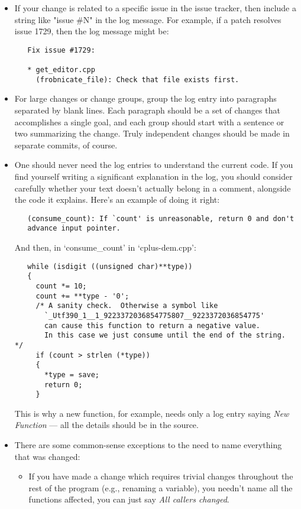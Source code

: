 \begin{itemize}
    \item If your change is related to a specific issue in the issue tracker,
        then include a string like "issue \#N" in the log message.  For
        example, if a patch resolves issue 1729, then the log message might
        be:
\begin{Verbatim}
   Fix issue #1729:

   * get_editor.cpp
     (frobnicate_file): Check that file exists first.
\end{Verbatim}

    \item For large changes or change groups, group the log entry into
        paragraphs separated by blank lines.  Each paragraph should be a set
        of changes that accomplishes a single goal, and each group should
        start with a sentence or two summarizing the change.  Truly
        independent changes should be made in separate commits, of course.

    \item One should never need the log entries to understand the current code.
        If you find yourself writing a significant explanation in the log, you
        should consider carefully whether your text doesn't actually belong in
        a comment, alongside the code it explains.  Here's an example of doing
        it right:
\begin{Verbatim}
   (consume_count): If `count' is unreasonable, return 0 and don't
   advance input pointer.
\end{Verbatim}
        And then, in `consume\_count' in `cplus-dem.cpp':
\begin{Verbatim}
   while (isdigit ((unsigned char)**type))
   {
     count *= 10;
     count += **type - '0';
     /* A sanity check.  Otherwise a symbol like
       `_Utf390_1__1_9223372036854775807__9223372036854775'
       can cause this function to return a negative value.
       In this case we just consume until the end of the string.  */
     if (count > strlen (*type))
     {
       *type = save;
       return 0;
     }
\end{Verbatim}
        This is why a new function, for example, needs only a log entry saying
        \emph{New Function} --- all the details should be in the source.

    \item There are some common-sense exceptions to the need to name everything
        that was changed:
        \begin{itemize}
        \item If you have made a change which requires trivial changes
          throughout the rest of the program (e.g., renaming a variable),
          you needn't name all the functions affected, you can just say
          \emph{All callers changed}.


\end{itemize}
\end{itemize}
